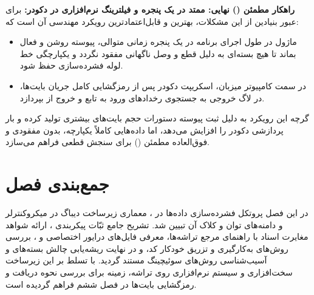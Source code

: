 \textbf{راهکار مطمئن () نهایی:  ممتد در یک پنجره‌ و فیلترینگ نرم‌افزاری در دکودر:}
برای عبور بنیادین از این مشکلات، بهترین و قابل‌اعتمادترین رویکرد مهندسی آن است که:
\begin{itemize}
    \item ماژول  در طول اجرای برنامه در یک پنجره زمانی متوالی، پیوسته روشن و فعال بماند تا هیچ بسته‌ای به دلیل قطع و وصل ناگهانی مفقود نگردد و یکپارچگی خط لوله فشرده‌سازی حفظ شود.
    \item در سمت کامپیوتر میزبان، اسکریپت دکودر پس از رمزگشایی کامل جریان بایت‌ها، در لاگ خروجی به جستجوی رخدادهای ورود به تابع  و خروج از  بپردازد.
\end{itemize}
گرچه این رویکرد به دلیل ثبت پیوسته دستورات حجم بایت‌های بیشتری تولید کرده و بار پردازشی دکودر را افزایش می‌دهد، اما داده‌هایی کاملاً یکپارچه، بدون مفقودی و فوق‌العاده مطمئن () برای سنجش قطعی  فراهم می‌سازد.

\section{جمع‌بندی فصل}
در این فصل پروتکل فشرده‌سازی داده‌ها در ، معماری زیرساخت دیباگ در میکروکنترلر  و دامنه‌های توان و کلاک آن تبیین شد. تشریح جامع ثبّات پیکربندی ، ارائه شواهد مغایرت اسناد  با راهنمای مرجع تراشه‌ها، معرفی فایل‌های درایور اختصاصی  و ، بررسی روش‌های به‌کارگیری و تزریق خودکار کد، و در نهایت ریشه‌یابی چالش بسته‌های  و آسیب‌شناسی روش‌های سوئیچینگ  مستند گردید. با تسلط بر این زیرساخت سخت‌افزاری و سیستم نرم‌افزاری روی تراشه، زمینه برای بررسی نحوه دریافت و رمزگشایی بایت‌ها در فصل ششم فراهم گردیده است.
